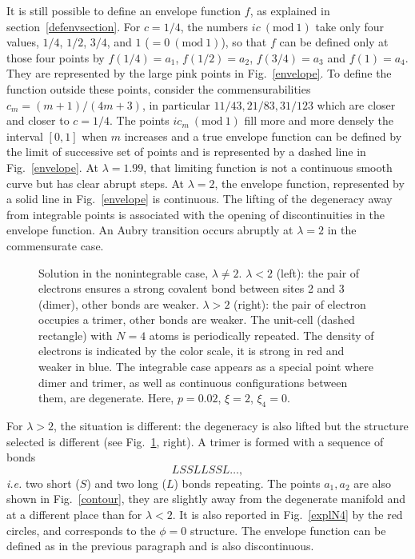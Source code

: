 \documentclass[]{revtex4-1}
\begin{document}
It is still possible to define an envelope function $f$, as explained in
section~\ref{defenvsection}. For $c=1/4$, the numbers $ic~(\mbox{mod}~1)$ take
only four values, $1/4$, $1/2$, $3/4$, and $1$ ($=0~(\mbox{mod}~1)$), so that $f$
can be defined only at those four points by $f(1/4)=a_1$, $f(1/2)=a_2$,
$f(3/4)=a_3$ and $f(1)=a_4$. They are represented by the large pink points in
Fig.~\ref{envelope}. To define the function outside these points, consider the commensurabilities
$c_m=(m+1)/(4m+3)$, in particular $11/43,21/83,31/123$ which are
closer and closer to $c=1/4$. The points $ic_m~(\mbox{mod}~1)$ fill more
and more densely the  interval $[0,1]$ when $m$ increases and a true envelope function can be defined
 by the limit of successive set of points and is represented by a dashed line in Fig.~\ref{envelope}. 
 At $\lambda=1.99$, that limiting function is
not a continuous smooth curve but has clear abrupt
steps. At $\lambda=2$, the envelope function, represented by a solid line in Fig.~\ref{envelope} is continuous.
The lifting of the degeneracy away from integrable points is associated with the opening of discontinuities in the envelope function.
An Aubry transition occurs abruptly at $\lambda=2$ in the commensurate case.

\begin{figure}[h]
           \caption{Solution in the nonintegrable case, $\lambda \neq 2$. $\lambda<2$ (left): the pair of electrons ensures a strong covalent bond between sites 2 and 3  (dimer), other bonds are weaker. $\lambda>2$ (right): the pair of electron occupies a trimer, other bonds are weaker. The unit-cell (dashed rectangle) with $N=4$ atoms is periodically repeated. The density of electrons is indicated by the color scale, it is strong in red and weaker in blue. The integrable case appears as a special point where dimer and trimer, as well as continuous configurations between them, are degenerate. Here, $p=0.02$, $\xi=2$, $\xi_4=0$.}
  \label{examplesolutionN4}
\end{figure}

For $\lambda>2$, the situation is different: the degeneracy is also lifted but the structure selected is different (see Fig.~\ref{examplesolutionN4}, right). A trimer is formed with a sequence of bonds \begin{equation} LSSLLSSL\dots, \end{equation} \textit{i.e.} two short ($S$) and two long ($L$) bonds repeating. The points $a_1,a_2$ are also shown in Fig.~\ref{contour}, they are slightly away from the degenerate manifold and at a different place than for $\lambda<2$. It is also reported in Fig.~\ref{explN4} by the red circles, and corresponds to the $\phi=0$ structure.  The envelope function can be defined as in the previous paragraph and is also discontinuous.
\end{document}
